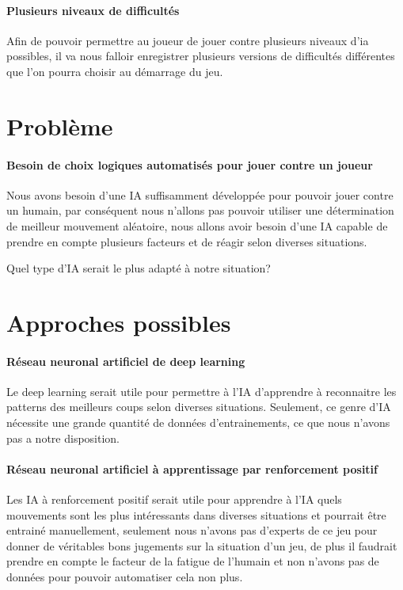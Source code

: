 \documentclass{scrreprt}
\begin{document}
			\paragraph{Plusieurs niveaux de difficultés}
			
			Afin de pouvoir permettre au joueur de jouer contre plusieurs niveaux d'ia possibles, il va nous falloir enregistrer plusieurs versions de difficultés différentes que l'on pourra choisir au démarrage du jeu.
			
		\section{Problème}
			\paragraph{Besoin de choix logiques automatisés pour jouer contre un joueur}
			
			Nous avons besoin d'une IA suffisamment développée pour pouvoir jouer contre un humain, par conséquent nous n'allons pas pouvoir utiliser une détermination de meilleur mouvement aléatoire, nous allons avoir besoin d'une IA capable de prendre en compte plusieurs facteurs et de réagir selon diverses situations.
			
			Quel type d'IA serait le plus adapté à notre situation?
			
		\section{Approches possibles}
		
			\paragraph{Réseau neuronal artificiel de deep learning}
			
			Le deep learning serait utile pour permettre à l'IA d'apprendre à reconnaitre les patterns des meilleurs coups selon diverses situations. Seulement, ce genre d'IA nécessite une grande quantité de données d'entrainements, ce que nous n'avons pas a notre disposition.
			
			\paragraph{Réseau neuronal artificiel à apprentissage par renforcement positif}
			
			Les IA à renforcement positif serait utile pour apprendre à l'IA quels mouvements sont les plus intéressants dans diverses situations et pourrait être entrainé manuellement, seulement nous n'avons pas d'experts de ce jeu pour donner de véritables bons jugements sur la situation d'un jeu, de plus il faudrait prendre en compte le facteur de la fatigue de l'humain et non n'avons pas de données pour pouvoir automatiser cela non plus. 
						
\end{document}
